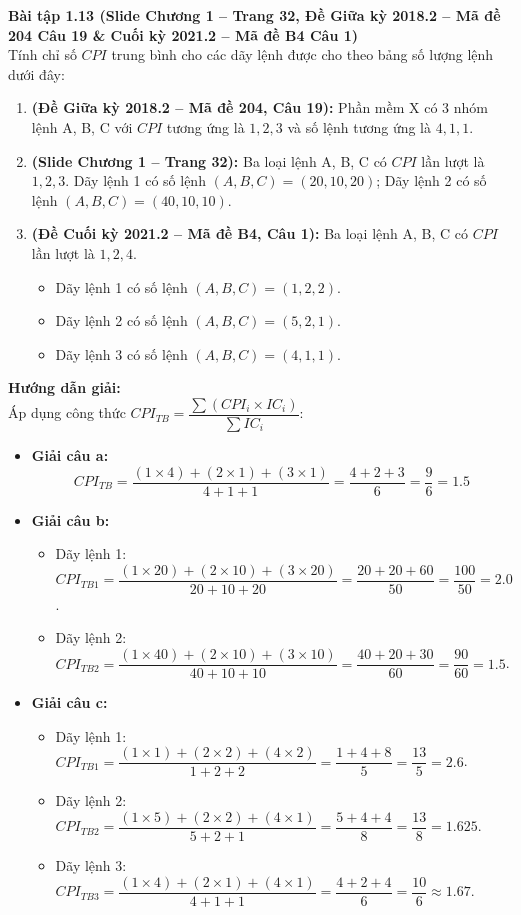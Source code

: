 \textbf{Bài tập 1.13 (Slide Chương 1 -- Trang 32, Đề Giữa kỳ 2018.2 -- Mã đề 204 Câu 19 \& Cuối kỳ 2021.2 -- Mã đề B4 Câu 1)}\\
Tính chỉ số $CPI$ trung bình cho các dãy lệnh được cho theo bảng số lượng lệnh dưới đây:
\begin{enumerate}[label=\alph*)]
    \item \textbf{(Đề Giữa kỳ 2018.2 -- Mã đề 204, Câu 19):} Phần mềm X có 3 nhóm lệnh A, B, C với $CPI$ tương ứng là $1, 2, 3$ và số lệnh tương ứng là $4, 1, 1$.
    \item \textbf{(Slide Chương 1 -- Trang 32):} Ba loại lệnh A, B, C có $CPI$ lần lượt là $1, 2, 3$. Dãy lệnh 1 có số lệnh $(A, B, C) = (20, 10, 20)$; Dãy lệnh 2 có số lệnh $(A, B, C) = (40, 10, 10)$.
    \item \textbf{(Đề Cuối kỳ 2021.2 -- Mã đề B4, Câu 1):} Ba loại lệnh A, B, C có $CPI$ lần lượt là $1, 2, 4$.
    \begin{itemize}
        \item Dãy lệnh 1 có số lệnh $(A, B, C) = (1, 2, 2)$.
        \item Dãy lệnh 2 có số lệnh $(A, B, C) = (5, 2, 1)$.
        \item Dãy lệnh 3 có số lệnh $(A, B, C) = (4, 1, 1)$.
    \end{itemize}
\end{enumerate}
\textbf{Hướng dẫn giải:}\\
Áp dụng công thức $CPI_{TB} = \dfrac{\sum (CPI_i \times IC_i)}{\sum IC_i}$:
\begin{itemize}
    \item \textbf{Giải câu a:}
    $$CPI_{TB} = \frac{(1 \times 4) + (2 \times 1) + (3 \times 1)}{4 + 1 + 1} = \frac{4 + 2 + 3}{6} = \frac{9}{6} = 1.5$$
    \item \textbf{Giải câu b:}
    \begin{itemize}
        \item Dãy lệnh 1: $CPI_{TB1} = \dfrac{(1 \times 20) + (2 \times 10) + (3 \times 20)}{20 + 10 + 20} = \dfrac{20 + 20 + 60}{50} = \dfrac{100}{50} = 2.0$.
        \item Dãy lệnh 2: $CPI_{TB2} = \dfrac{(1 \times 40) + (2 \times 10) + (3 \times 10)}{40 + 10 + 10} = \dfrac{40 + 20 + 30}{60} = \dfrac{90}{60} = 1.5$.
    \end{itemize}
    \item \textbf{Giải câu c:}
    \begin{itemize}
        \item Dãy lệnh 1: $CPI_{TB1} = \dfrac{(1 \times 1) + (2 \times 2) + (4 \times 2)}{1 + 2 + 2} = \dfrac{1 + 4 + 8}{5} = \dfrac{13}{5} = 2.6$.
        \item Dãy lệnh 2: $CPI_{TB2} = \dfrac{(1 \times 5) + (2 \times 2) + (4 \times 1)}{5 + 2 + 1} = \dfrac{5 + 4 + 4}{8} = \dfrac{13}{8} = 1.625$.
        \item Dãy lệnh 3: $CPI_{TB3} = \dfrac{(1 \times 4) + (2 \times 1) + (4 \times 1)}{4 + 1 + 1} = \dfrac{4 + 2 + 4}{6} = \dfrac{10}{6} \approx 1.67$.
    \end{itemize}
\end{itemize}

